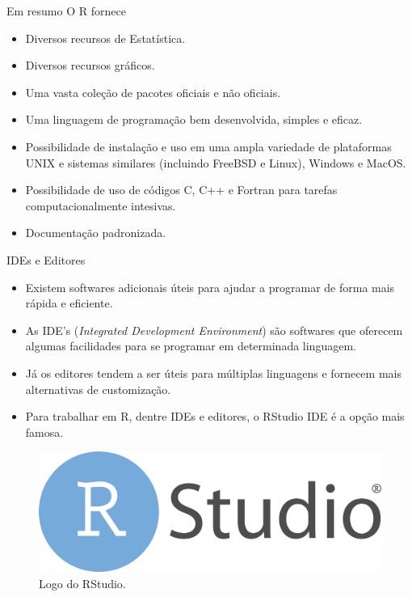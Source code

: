 \documentclass[
  ignorenonframetext,
  serif,
  professionalfont,
  usenames,
  dvipsnames,
  aspectratio = 169]{beamer}
\providecommand{\tightlist}{%
  \setlength{\itemsep}{0pt}\setlength{\parskip}{0pt}}
\renewcommand{\tightlist}{%
  \setlength{\itemsep}{0\baselineskip}
  \setlength{\parskip}{0.25\baselineskip}
}
\def\beginAHalfColumn{\begin{minipage}{0.49\textwidth}}%
\def\endColumns{\end{minipage}}%
\begin{document}
\begin{frame}{Em resumo}
\protect\hypertarget{em-resumo}{}
O R fornece

\begin{itemize}
\tightlist
\item
  Diversos recursos de Estatística.
\item
  Diversos recursos gráficos.
\item
  Uma vasta coleção de pacotes oficiais e não oficiais.
\item
  Uma linguagem de programação bem desenvolvida, simples e eficaz.
\item
  Possibilidade de instalação e uso em uma ampla variedade de
  plataformas UNIX e sistemas similares (incluindo FreeBSD e Linux),
  Windows e MacOS.
\item
  Possibilidade de uso de códigos C, C++ e Fortran para tarefas
  computacionalmente intesivas.
\item
  Documentação padronizada.
\end{itemize}
\end{frame}

\begin{frame}{IDEs e Editores}
\protect\hypertarget{ides-e-editores}{}
\beginAHalfColumn

\begin{itemize}
\item
  Existem softwares adicionais úteis para ajudar a programar de forma
  mais rápida e eficiente.
\item
  As IDE's (\emph{Integrated Development Environment}) são softwares que
  oferecem algumas facilidades para se programar em determinada
  linguagem.
\item
  Já os editores tendem a ser úteis para múltiplas linguagens e fornecem
  mais alternativas de customização.
\end{itemize}

\endColumns
\beginAHalfColumn

\begin{itemize}
\tightlist
\item
  Para trabalhar em R, dentre IDEs e editores, o RStudio IDE é a opção
  mais famosa.
\end{itemize}

\vspace{1cm}

\begin{figure}

{\centering \includegraphics[width=0.6\linewidth]{./img/rstudiologo} 

}

\caption{Logo do RStudio.}\label{fig:unnamed-chunk-11}
\end{figure}

\endColumns
\end{frame}
\end{document}
